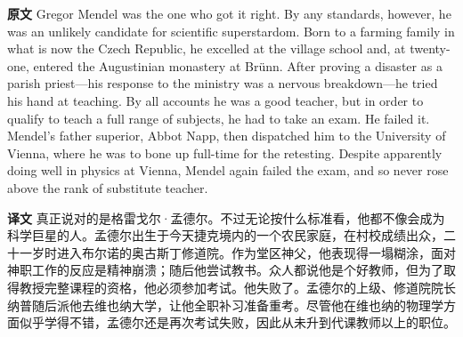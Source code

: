 \documentclass[UTF8,zihao=-4]{ctexart}
\newcommand{\BodyFont}{\fontsize{10.5pt}{15.5pt}\selectfont}
\renewenvironment{quote}{\par\noindent\begingroup\BodyFont}{\par\endgroup}
\begin{document}
\begin{quote}
\noindent\textbf{原文} Gregor Mendel was the one who got it right. By any standards, however, he was an unlikely candidate for scientific superstardom. Born to a farming family in what is now the Czech Republic, he excelled at the village school and, at twenty-one, entered the Augustinian monastery at Brünn. After proving a disaster as a parish priest---his response to the ministry was a nervous breakdown---he tried his hand at teaching. By all accounts he was a good teacher, but in order to qualify to teach a full range of subjects, he had to take an exam. He failed it. Mendel's father superior, Abbot Napp, then dispatched him to the University of Vienna, where he was to bone up full-time for the retesting. Despite apparently doing well in physics at Vienna, Mendel again failed the exam, and so never rose above the rank of substitute teacher.

\smallskip
\noindent\textbf{译文} 真正说对的是格雷戈尔·孟德尔。不过无论按什么标准看，他都不像会成为科学巨星的人。孟德尔出生于今天捷克境内的一个农民家庭，在村校成绩出众，二十一岁时进入布尔诺的奥古斯丁修道院。作为堂区神父，他表现得一塌糊涂，面对神职工作的反应是精神崩溃；随后他尝试教书。众人都说他是个好教师，但为了取得教授完整课程的资格，他必须参加考试。他失败了。孟德尔的上级、修道院院长纳普随后派他去维也纳大学，让他全职补习准备重考。尽管他在维也纳的物理学方面似乎学得不错，孟德尔还是再次考试失败，因此从未升到代课教师以上的职位。
\end{quote}
\end{document}
